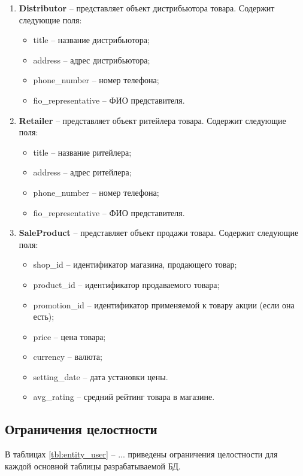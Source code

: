 \begin{enumerate}
	\item \textbf{Distributor} -- представляет объект дистрибьютора товара. Содержит следующие поля: 
	\begin{itemize}
		\item title -- название дистрибьютора;
		\item address -- адрес дистрибьютора;
		\item phone\_number -- номер телефона;
		\item fio\_representative -- ФИО представителя.
	\end{itemize}
	
	\item \textbf{Retailer} -- представляет объект ритейлера товара. Содержит следующие поля: 
	\begin{itemize}
		\item title -- название ритейлера;
		\item address -- адрес ритейлера;
		\item phone\_number -- номер телефона;
		\item fio\_representative -- ФИО представителя.
	\end{itemize}
	
	\item \textbf{SaleProduct} -- представляет объект продажи товара. Содержит следующие поля: 
	\begin{itemize}
		\item shop\_id -- идентификатор магазина, продающего товар;
		\item product\_id -- идентификатор продаваемого товара;
		\item promotion\_id -- идентификатор применяемой к товару акции (если она есть);
		\item price -- цена товара;
		\item currency -- валюта;
		\item setting\_date -- дата установки цены.
		\item avg\_rating -- средний рейтинг товара в магазине.
	\end{itemize}
	
\end{enumerate}

\subsection{Ограничения целостности}

В таблицах \ref{tbl:entity_user} -- ... приведены ограничения целостности для каждой основной таблицы разрабатываемой БД.
 
